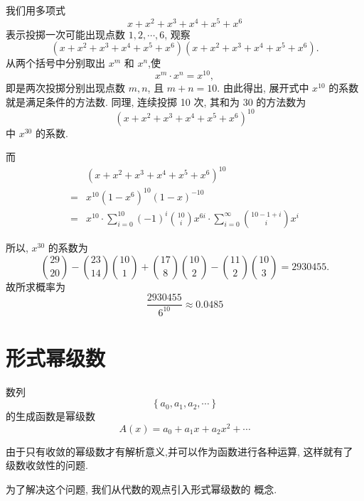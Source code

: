 \documentclass[punct]{ctexbeamer}
\def\sol{\noindent {\bf 解\ }}
\begin{document}
\begin{frame}
\sol 我们用多项式
$$
x+x^{2}+x^{3}+x^{4}+x^{5}+x^{6}
$$
表示投掷一次可能出现点数 $1,2, \cdots, 6$, 观察
$$
\left(x+x^{2}+x^{3}+x^{4}+x^{5}+x^{6}\right)\left(x+x^{2}+x^{3}+x^{4}+x^{5}+x^{6}\right).
$$
从两个括号中分别取出 $x^{m}$ 和 $x^{n}$,使
$$
x^{m} \cdot x^{n}=x^{10},
$$
即是两次投掷分别出现点数 $m, n$, 且 $m+n=10.$ 由此得出, 展开式中 $x^{10}$ 的系数 就是满足条件的方法数.
同理, 连续投掷 10 次, 其和为 30 的方法数为
$$
\left(x+x^{2}+x^{3}+x^{4}+x^{5}+x^{6}\right)^{10}
$$
中 $x^{30}$ 的系数.
\end{frame}

\begin{frame}
	而
	$$
	\begin{aligned}
	&\left(x+x^{2}+x^{3}+x^{4}+x^{5}+x^{6}\right)^{10} \\
	=&x^{10}\left(1-x^{6}\right)^{10}(1-x)^{-10} \\
	=&x^{10} \cdot \sum_{i=0}^{10}(-1)^{i}\binom{10}{i} x^{6 i} \cdot \sum_{i=0}^{\infty}\binom{10-1+i}{i} x^{i}
	\end{aligned}
	$$

	所以, $x^{30}$ 的系数为
	$$
	\binom{29}{20}-\binom{23}{14}\binom{10}{1}+\binom{17}{8}\binom{10}{2}-\binom{11}{2}\binom{10}{3}=2930455.
	$$
	故所求概率为
	$$
	\frac{2930455}{6^{10}} \approx 0.0485
	$$
\end{frame}

\section{形式幂级数}

\begin{frame}
数列
$$
\left\{a_{0}, a_{1}, a_{2}, \cdots\right\}
$$
的生成函数是幂级数
$$
A(x)=a_{0}+a_{1} x+a_{2} x^{2}+\cdots
$$


由于只有收敛的幂级数才有解析意义,并可以作为函数进行各种运算, 这样就有了 级数收敛性的问题.

 为了解决这个问题, 我们从代数的观点引入形式幂级数的 概念.

\end{frame}
\end{document}
